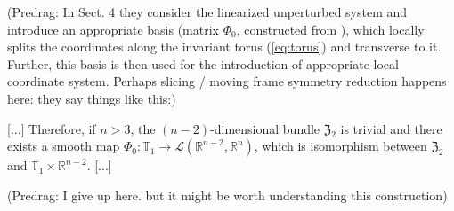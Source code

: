 \begin{description}
(Predrag: In Sect. 4 they consider the linearized unperturbed system and introduce
an appropriate basis (matrix $\Phi_{0}$, constructed from ),
which locally splits the coordinates along the invariant torus
(\ref{eq:torus}) and transverse to it. Further, this basis is then used
for the introduction of appropriate local coordinate system. Perhaps slicing
 / moving frame symmetry reduction happens here: they say things like this:)

[...]
Therefore, if $n>3$, the $(n-2)$-dimensional
bundle $\mathfrak{Z}_{2}$ is trivial and there exists a smooth map
$\Phi_{0}:\mathbb{T}_{1}\to\mathcal{L}(\mathbb{R}^{n-2},\mathbb{R}^{n})$,
which is isomorphism between $\mathfrak{Z}_{2}$ and $\mathbb{T}_{1}\times\mathbb{R}^{n-2}.$
[...]

(Predrag: I give up here. but it might be worth understanding this construction)




\end{description}

\renewcommand{\ssp}{a}
